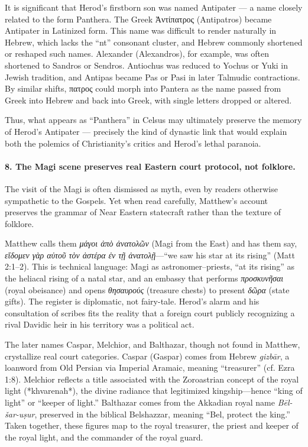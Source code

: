 It is significant that Herod’s firstborn son was named Antipater — a name closely related to the form Panthera.
The Greek Ἀντίπατρος (Antipatros) became Antipater in Latinized form.
This name was difficult to render naturally in Hebrew, which lacks the “nt” consonant cluster, and Hebrew commonly shortened or reshaped such names.
Alexander (Alexandros), for example, was often shortened to Sandros or Sendros.
Antiochus was reduced to Yochus or Yuki in Jewish tradition, and Antipas became Pas or Pasi in later Talmudic contractions.
By similar shifts, πατρος could morph into Pantera as the name passed from Greek into Hebrew and back into Greek, with single letters dropped or altered.

Thus, what appears as “Panthera” in Celsus may ultimately preserve the memory of Herod’s Antipater — precisely the kind of dynastic link that would explain both the polemics of Christianity’s critics and Herod’s lethal paranoia.

\paragraph{8.
The Magi scene preserves real Eastern court protocol, not folklore.}\label{par:magi-court-protocol}

The visit of the Magi is often dismissed as myth, even by readers otherwise sympathetic to the Gospels.
Yet when read carefully, Matthew’s account preserves the grammar of Near Eastern statecraft rather than the texture of folklore.

Matthew calls them \textit{μάγοι ἀπὸ ἀνατολῶν} (Magi from the East) and has them say, \textit{εἴδομεν γὰρ αὐτοῦ τὸν ἀστέρα ἐν τῇ ἀνατολῇ}—“we saw his star at its rising” (Matt 2:1–2).
This is technical language: Magi as astronomer–priests, “at its rising” as the heliacal rising of a natal star, and an embassy that performs \textit{προσκυνῆσαι} (royal obeisance) and opens \textit{θησαυρούς} (treasure chests) to present \textit{δῶρα} (state gifts).
The register is diplomatic, not fairy-tale.
Herod’s alarm and his consultation of scribes fits the reality that a foreign court publicly recognizing a rival Davidic heir in his territory was a political act.

The later names Caspar, Melchior, and Balthazar, though not found in Matthew, crystallize real court categories.
Caspar (Gaspar) comes from Hebrew \textit{gizbār}, a loanword from Old Persian via Imperial Aramaic, meaning “treasurer” (cf. Ezra 1:8).
Melchior reflects a title associated with the Zoroastrian concept of the royal light (*khvarenah*), the divine radiance that legitimized kingship—hence “king of light” or “keeper of light.”
Balthazar comes from the Akkadian royal name \textit{Bēl-šar-uṣur}, preserved in the biblical Belshazzar, meaning “Bel, protect the king.”
Taken together, these figures map to the royal treasurer, the priest and keeper of the royal light, and the commander of the royal guard.

